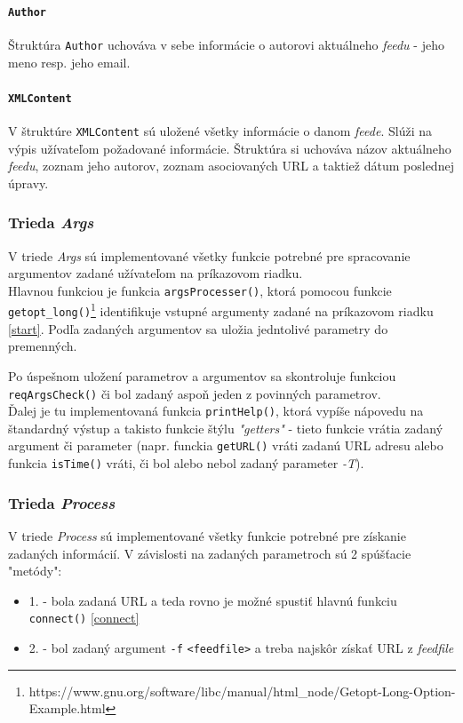 \documentclass[a4paper, 11pt]{article}
\begin{document}
    \paragraph{\texttt{Author}}
    \label{author}
    Štruktúra \texttt{Author} uchováva v sebe informácie o autorovi aktuálneho \textit{feedu} - jeho meno resp. jeho email.

    \paragraph{\texttt{XMLContent}}
    \label{content}
    V štruktúre \texttt{XMLContent} sú uložené všetky informácie o danom \textit{feede}. Slúži na výpis užívateľom požadované informácie. Štruktúra si uchováva názov aktuálneho \textit{feedu}, zoznam jeho autorov, zoznam asociovaných URL a taktiež dátum poslednej úpravy.

    \subsubsection{Trieda \textit{Args}}
    \label{Args}
    V triede \textit{Args} sú implementované všetky funkcie potrebné pre spracovanie argumentov zadané užívateľom na príkazovom riadku. \\ 

    Hlavnou funkciou je funkcia \texttt{argsProcesser()}, ktorá pomocou funkcie \texttt{getopt\_long()}\footnote{https://www.gnu.org/software/libc/manual/html\_node/Getopt-Long-Option-Example.html} identifikuje vstupné argumenty zadané na príkazovom riadku \ref{start}. Podľa zadaných argumentov sa uložia jedntolivé parametry do premenných. 
	
    Po úspešnom uložení parametrov a argumentov sa skontroluje funkciou \texttt{reqArgsCheck()} či bol zadaný aspoň jeden z povinných parametrov. \\
	
    Ďalej je tu implementovaná funkcia \texttt{printHelp()}, ktorá vypíše nápovedu na štandardný výstup a takisto funkcie štýlu \textit{"getters"} - tieto funkcie vrátia zadaný argument či parameter (napr. funckia \texttt{getURL()} vráti zadanú URL adresu alebo funkcia \texttt{isTime()} vráti, či bol alebo nebol zadaný parameter \textit{-T}). \\

    \subsubsection{Trieda \textit{Process}}
    \label{Process}
    V triede \textit{Process} sú implementované všetky funkcie potrebné pre získanie zadaných informácií. V závislosti na zadaných parametroch sú 2 spúšťacie "metódy": 
    \begin{itemize}
        \item 1. - bola zadaná URL a teda rovno je možné spustiť hlavnú funkciu \texttt{connect()} \ref{connect}
	\item 2. - bol zadaný argument \texttt{-f} \texttt{<feedfile>} a treba najskôr získať URL z \textit{feedfile}
    \end{itemize}
	
\end{document}
